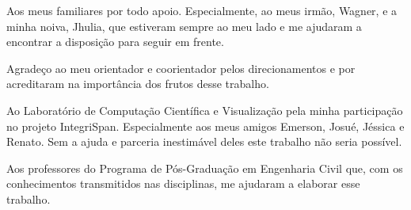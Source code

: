 \begin{agradecimentos}

Aos meus familiares por todo apoio. Especialmente, ao meus irmão, Wagner, e a minha noiva, Jhulia, que estiveram sempre ao meu lado e me ajudaram a encontrar a disposição para seguir em frente.

Agradeço ao meu orientador e coorientador pelos direcionamentos e por acreditaram na importância dos frutos desse trabalho.

Ao Laboratório de Computação Científica e Visualização pela minha participação no projeto IntegriSpan. Especialmente aos meus amigos Emerson, Josué, Jéssica e Renato. Sem a ajuda e parceria inestimável deles este trabalho não seria possível.

Aos professores do Programa de Pós-Graduação em Engenharia Civil que, com os conhecimentos transmitidos nas disciplinas, me ajudaram a elaborar esse trabalho.

\end{agradecimentos}
